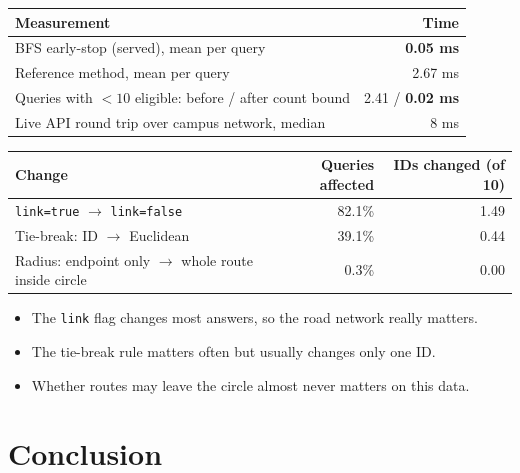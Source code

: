 \documentclass[11pt,a4paper]{article}
\newcommand{\code}[1]{\texttt{#1}}
\newcommand{\thead}{\rowcolor{accentlight}}
\begin{document}
\begin{center}\begin{minipage}{\textwidth}
\begin{tabularx}{\textwidth}{@{}Xr@{}}
\toprule
\thead \sffamily\bfseries Measurement & \sffamily\bfseries Time \\
\midrule
BFS early-stop (served), mean per query & \textbf{0.05 ms} \\
Reference method, mean per query & 2.67 ms \\
Queries with $<10$ eligible: before / after count bound & 2.41 / \textbf{0.02 ms} \\
Live API round trip over campus network, median & 8 ms \\
\bottomrule
\end{tabularx}
\end{minipage}\end{center}

\begin{center}\begin{minipage}{\textwidth}
\begin{tabularx}{\textwidth}{@{}Xrr@{}}
\toprule
\thead \sffamily\bfseries Change & \sffamily\bfseries Queries affected & \sffamily\bfseries IDs changed (of 10) \\
\midrule
\code{link=true} $\rightarrow$ \code{link=false} & 82.1\% & 1.49 \\
Tie-break: ID $\rightarrow$ Euclidean & 39.1\% & 0.44 \\
Radius: endpoint only $\rightarrow$ whole route inside circle & 0.3\% & 0.00 \\
\bottomrule
\end{tabularx}
\end{minipage}\end{center}

\begin{itemize}
  \item The \code{link} flag changes most answers, so the road network really matters.
  \item The tie-break rule matters often but usually changes only one ID.
  \item Whether routes may leave the circle almost never matters on this data.
\end{itemize}

\section{Conclusion}
\end{document}
